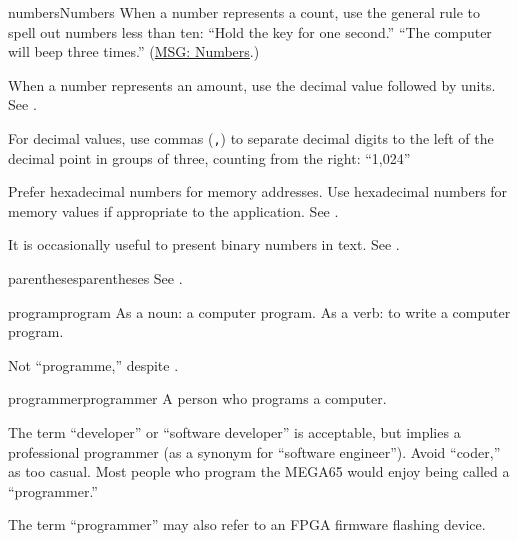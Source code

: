 \begin{sgentry}{numbers}{Numbers}
    When a number represents a count, use the general rule to spell out numbers less than ten: ``Hold the key for one second.'' ``The computer will beep three times.'' (\href{https://learn.microsoft.com/en-us/style-guide/numbers}{MSG: Numbers}.)

    When a number represents an amount, use the decimal value followed by units. See .

    For decimal values, use commas (\texttt{,}) to separate decimal digits to the left of the decimal point in groups of three, counting from the right: ``1,024''

    Prefer hexadecimal numbers for memory addresses. Use hexadecimal numbers for memory values if appropriate to the application. See .

    It is occasionally useful to present binary numbers in text. See .
\end{sgentry}

\begin{sgentry}{parentheses}{parentheses}
    See .
\end{sgentry}

\begin{sgentry}{program}{program}
    As a noun: a computer program. As a verb: to write a computer program.

    Not ``programme,'' despite .
\end{sgentry}

\begin{sgentry}{programmer}{programmer}
    A person who programs a computer.

    The term ``developer'' or ``software developer'' is acceptable, but implies a professional programmer (as a synonym for ``software engineer''). Avoid ``coder,'' as too casual. Most people who program the MEGA65 would enjoy being called a ``programmer.''

    The term ``programmer'' may also refer to an FPGA firmware flashing device.
\end{sgentry}

